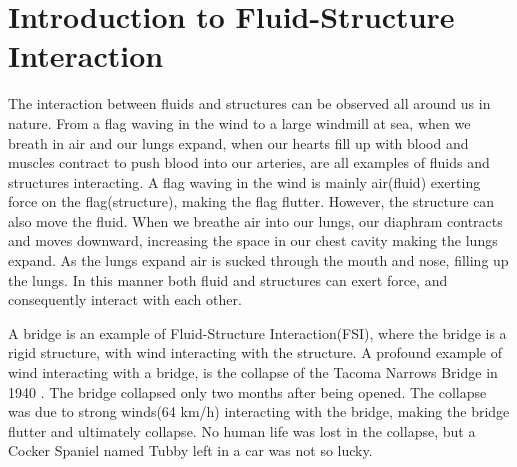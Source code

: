 \chapter{Introduction to Fluid-Structure Interaction}
The interaction between fluids and structures can be observed all around us in nature.
From a flag waving in the wind to a large windmill at sea, when we breath in air and our lungs expand, when our hearts fill up with blood and muscles contract to push blood into our arteries, are all examples of fluids and structures interacting. A flag waving in the wind is mainly air(fluid) exerting force on the flag(structure), making the flag flutter. However, the structure can also move the fluid. 
When we breathe air into our lungs, our diaphram contracts and moves downward, increasing the space in our chest cavity making the lungs expand. As the lungs expand air is sucked through the mouth and nose, filling up the lungs. In this manner both fluid and structures can exert force, and consequently interact with each other. 

A bridge is an example of Fluid-Structure Interaction(FSI), where the bridge is a rigid structure, with wind interacting with the structure.
A profound example of wind interacting with a bridge, is the collapse of the Tacoma Narrows Bridge in 1940 \cite{Billah1991}. The bridge collapsed only two months after being opened. The collapse was due to strong winds(64 km/h) interacting with the bridge, making the bridge flutter and ultimately collapse. No human life was lost in the collapse, but a Cocker Spaniel named Tubby left in a car was not so lucky. \newline

